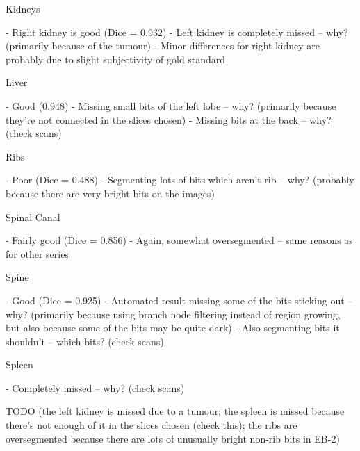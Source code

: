 Kidneys

- Right kidney is good (Dice = 0.932)
- Left kidney is completely missed -- why? (primarily because of the tumour)
- Minor differences for right kidney are probably due to slight subjectivity of gold standard

Liver

- Good (0.948)
- Missing small bits of the left lobe -- why? (primarily because they're not connected in the slices chosen)
- Missing bits at the back -- why? (check scans)

Ribs

- Poor (Dice = 0.488)
- Segmenting lots of bits which aren't rib -- why? (probably because there are very bright bits on the images)

Spinal Canal

- Fairly good (Dice = 0.856)
- Again, somewhat oversegmented -- same reasons as for other series

Spine

- Good (Dice = 0.925)
- Automated result missing some of the bits sticking out -- why? (primarily because using branch node filtering instead of region growing, but also because some of the bits may be quite dark)
- Also segmenting bits it shouldn't -- which bits? (check scans)

Spleen

- Completely missed -- why? (check scans)

\fi

TODO (the left kidney is missed due to a tumour; the spleen is missed because there's not enough of it in the slices chosen (check this); the ribs are oversegmented because there are lots of unusually bright non-rib bits in EB-2)

